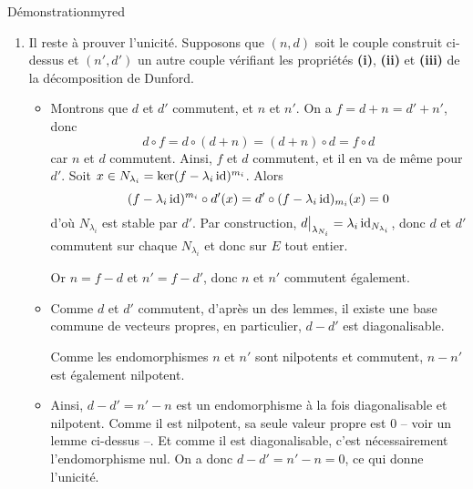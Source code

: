 \begin{demo}{Démonstration}{myred}
\begin{itemize}[label=\textcolor{myred}{$\to$}]
\begin{enumerate}
                \[ d \circ n(x) = d \circ n(x_1 + \cdots + x_r) = d \circ n(x_1) + \cdots + d \circ n(x_r) = n \circ d(x_1) + \cdots + n \circ d(x_r) = n \circ d(x) \]
                Ainsi, $d$ et $n$ commutent.
                \item Il reste à prouver l’unicité. Supposons que $(n,d)$ soit le couple construit ci-dessus et $(n', d')$ un autre couple vérifiant les propriétés \textbf{(i)}, \textbf{(ii)} et \textbf{(iii)} de la décomposition de Dunford.
                \begin{itemize}
                    \item Montrons que $d$ et $d'$ commutent, et $n$ et $n'$. On a $f = d + n = d' + n'$, donc 
                    \[ d \circ f = d \circ (d + n) = (d + n) \circ d = f \circ d \]    
                    car $n$ et $d$ commutent. Ainsi, $f$ et $d$ commutent, et il en va de même pour $d'$. Soit $x \in N_{\lambda_i} = \ker(f - \lambda_i \operatorname{id})^{m_i}$. Alors 
                    \[ (f - \lambda_i \operatorname{id})^{m_i} \circ d'(x) = d' \circ (f - \lambda_i \operatorname{id})_{m_i}(x) = 0 \]   
                    d’où $N_{\lambda_i}$ est stable par $d'$. Par construction, $\restr{d}{\lambda_{N_i}} = \lambda_i \id_{N_{\lambda_i}}$, donc $d$ et $d'$ commutent sur chaque $N_{\lambda_i}$ et donc sur $E$ tout entier.
                    
                    Or $n = f - d$ et $n' = f - d'$, donc $n$ et $n'$ commutent également.
                    \item Comme $d$ et $d'$ commutent, d’après un des lemmes, il existe une base commune de vecteurs propres, en particulier, $d - d'$ est diagonalisable. 
                    
                    Comme les endomorphismes $n$ et $n'$ sont nilpotents et commutent, $n - n'$ est également nilpotent. 
                    \item Ainsi, $d - d' = n' - n$ est un endomorphisme à la fois diagonalisable et nilpotent. Comme il est nilpotent, sa seule valeur propre est $0$ -- voir un lemme ci-dessus --. Et comme il est diagonalisable, c’est nécessairement l’endomorphisme nul. On a donc $d - d' = n' - n = 0$, ce qui donne l’unicité.
                \end{itemize}
            \end{enumerate}
        \end{itemize}
    \end{demo}

